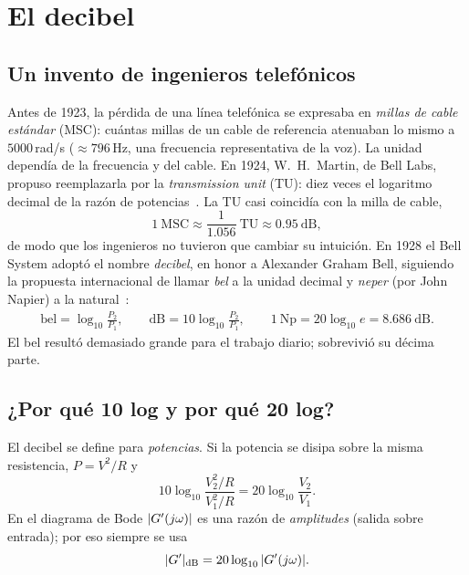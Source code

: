 \section{El decibel}
\label{sec:rf-decibel}

\subsection{Un invento de ingenieros telefónicos}

Antes de 1923, la pérdida de una línea telefónica se expresaba en \emph{millas de cable estándar} (MSC): cuántas millas de un cable de referencia atenuaban lo mismo a $5000$\,rad/s ($\approx796$\,Hz, una frecuencia representativa de la voz). La unidad dependía de la frecuencia y del cable. En 1924, W.~H.~Martin, de Bell Labs, propuso reemplazarla por la \emph{transmission unit} (TU): diez veces el logaritmo decimal de la razón de potencias~\citep{martin24}. La TU casi coincidía con la milla de cable,
\begin{equation}
  1\ \text{MSC}\approx\frac{1}{1.056}\ \text{TU}\approx 0.95\ \text{dB},
\end{equation}
de modo que los ingenieros no tuvieron que cambiar su intuición. En 1928 el Bell System adoptó el nombre \emph{decibel}, en honor a Alexander Graham Bell, siguiendo la propuesta internacional de llamar \emph{bel} a la unidad decimal y \emph{neper} (por John Napier) a la natural~\citep{martin29}:
\begin{gather}
  \text{bel}=\log_{10}\frac{P_2}{P_1},\qquad
  \text{dB}=10\log_{10}\frac{P_2}{P_1},\qquad
  1\ \text{Np}=20\log_{10}e=8.686\ \text{dB}.
\end{gather}
El bel resultó demasiado grande para el trabajo diario; sobrevivió su décima parte.

\subsection{¿Por qué 10 log y por qué 20 log?}

El decibel se define para \emph{potencias}. Si la potencia se disipa sobre la misma resistencia, $P=V^2/R$ y
\begin{equation}
  10\log_{10}\frac{V_2^2/R}{V_1^2/R}=20\log_{10}\frac{V_2}{V_1}.
\end{equation}
En el diagrama de Bode $|G'(j\omega)|$ es una razón de \emph{amplitudes} (salida sobre entrada); por eso siempre se usa
\begin{equation}
  |G'|_{\mathrm{dB}}=20\log_{10}|G'(j\omega)|.
\end{equation}

